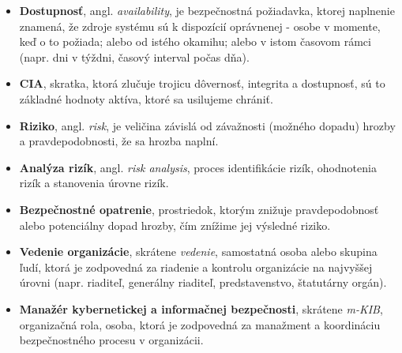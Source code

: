 \begin{itemize}
  \item \textbf{Dostupnosť}, angl. \textit{availability}, je bezpečnostná požiadavka, ktorej naplnenie znamená, že zdroje systému
    sú k dispozícií oprávnenej - osobe v momente, keď o to požiada; alebo od istého okamihu; alebo v istom časovom rámci
    (napr. dni v týždni, časový interval počas dňa).

  \item \textbf{CIA}, skratka, ktorá zlučuje trojicu dôvernosť, integrita a dostupnosť, sú to základné hodnoty aktíva, ktoré
    sa usilujeme chrániť.
  
  \item \textbf{Riziko}, angl. \textit{risk}, je veličina závislá od závažnosti (možného dopadu) hrozby a pravdepodobnosti, 
    že sa hrozba naplní.

  \item \textbf{Analýza rizík}, angl. \textit{risk analysis}, proces identifikácie rizík, ohodnotenia rizík a stanovenia
    úrovne rizík.
    
  \item \textbf{Bezpečnostné opatrenie}, prostriedok, ktorým znižuje pravdepodobnosť alebo potenciálny dopad hrozby,
  čím znížime jej výsledné riziko.

  \item \textbf{Vedenie organizácie}, skrátene \textit{vedenie}, samostatná osoba alebo skupina ľudí, ktorá je zodpovedná 
  za riadenie a kontrolu organizácie na najvyššej úrovni (napr. riaditeľ, generálny riaditeľ, predstavenstvo, štatutárny orgán).

  \item \textbf{Manažér kybernetickej a informačnej bezpečnosti}, skrátene \textit{m-KIB}, organizačná rola, osoba, ktorá je zodpovedná
    za manažment a koordináciu bezpečnostného procesu v organizácii.

\end{itemize}